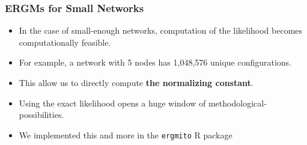 \documentclass[aspectratio=169, 9pt]{beamer}\usepackage[]{graphicx}\usepackage[]{color}
\newcommand{\ergmitopkg}[0]{\texttt{ergmito}}
\begin{document}
\begin{frame}[label=ergmito]
\frametitle{ERGMs for Small Networks}


\begin{itemize}[<+->]

\item In the case of small-enough networks, computation of the likelihood becomes
computationally feasible.

\item For example, a network with 5 nodes has 1,048,576
unique configurations.

\item This allow us to directly compute {\bf\color{normconst} the normalizing constant}.\pause

\item Using the exact likelihood opens a huge window of methodological-possibilities.

\item We implemented this and more in the \ergmitopkg{} R package \hyperlink{ergmitopkg}{}
\end{itemize}


\end{frame}
\end{document}
